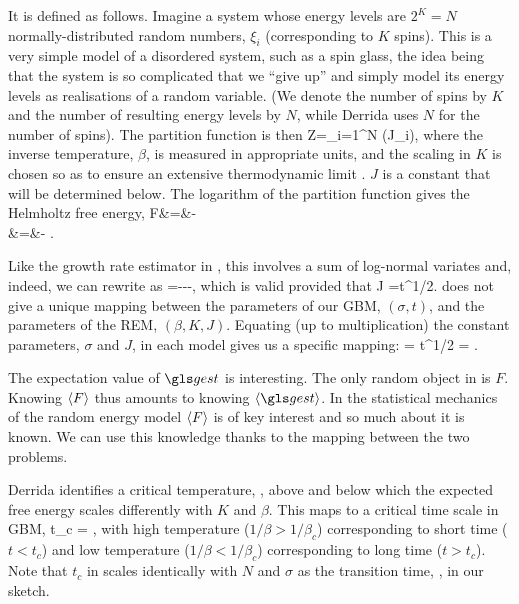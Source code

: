 It is defined as follows. Imagine a system whose energy levels are $2^K=N$ normally-distributed random numbers, $\xi_i$ (corresponding to $K$ spins). This is a very simple model of a disordered system, such as a spin glass, the idea being that the system is so complicated that we ``give up'' and simply model its energy levels as realisations of a random variable. (We denote the number 
of spins by $K$ and the number of resulting energy levels by $N$, while Derrida uses $N$ for the number of spins). The partition function is then
\be
Z=\sum_{i=1}^N \exp\left(\beta J\xi_i\right),
\ee
where the inverse temperature, $\beta$, is measured in appropriate units, and the scaling in $K$ is chosen
so as to ensure an extensive thermodynamic limit \cite[p.~79]{Derrida1980}. $J$ is a constant that will be determined below.
The logarithm of the partition function gives the Helmholtz free energy, 
\bea
F&=&-\\
&=&-  \ln\left[\sum_{i=1}^N \exp\left(\beta J \sqrt{\frac{K}{2}}\xi_i\right)\right].
\eea

Like the growth rate estimator in , this involves a sum of 
log-normal variates and, indeed, we can rewrite  as
\be
\gest=\mu---,
\ee
which is valid provided that
\be
\beta J =\sigma t^{1/2}.
\ee
{} does not give a unique mapping between the parameters of our GBM, $(\sigma, t)$, and the parameters of the REM, $(\beta, K, J)$. Equating (up to multiplication) the constant parameters, $\sigma$ and $J$, in each model gives us a specific mapping:
\be
\sigma= \quad {} \quad t^{1/2} = \beta{}.
\ee

The expectation value of $\gest$ is interesting. The only random object
in  is $F$. Knowing $\left\langle F \right\rangle$ thus amounts to knowing $\ave{\gest}$.
In the statistical mechanics of the random energy model $\left\langle F \right\rangle$ is of key
interest and so much about it is known. We can use this knowledge
thanks to the mapping between the two problems.

Derrida identifies a critical temperature,
\be
{} \equiv {},
\ee
above and below which the expected free energy scales differently with $K$ and $\beta$. This maps to a critical time scale in GBM,
\be
t_c = ,
\ee
with high temperature ($1/\beta>1/\beta_c$) corresponding to short time ($t<t_c$) and low temperature ($1/\beta<1/\beta_c$) corresponding to long time ($t>t_c$). Note that $t_c$ in  scales identically with $N$ and $\sigma$ as the transition time, , in our sketch.


